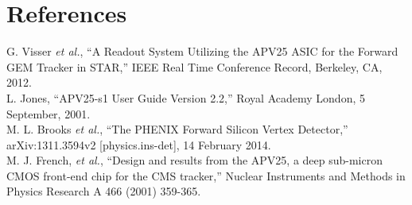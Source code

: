 \documentclass[preprint,12pt]{elsarticle}
\begin{document}
\section{References}
\begin{thebibliography}{999}
G. Visser {\it et al.}, ``A Readout System Utilizing the APV25 ASIC for the
Forward GEM Tracker in STAR,'' IEEE Real Time Conference Record, Berkeley, CA,
2012. \\
L. Jones, ``APV25-s1 User Guide Version 2.2,'' Royal Academy London, 5
September, 2001. \\
M. L. Brooks {\it et al.}, ``The PHENIX Forward Silicon Vertex Detector,''
arXiv:1311.3594v2 [physics.ins-det], 14 February 2014.\\
M. J. French, {\it et al.}, ``Design and results from the APV25, a deep
sub-micron CMOS front-end chip for the CMS tracker,'' Nuclear Instruments and
Methods in Physics Research A 466 (2001) 359-365.\\
\end{thebibliography}
\end{document}
